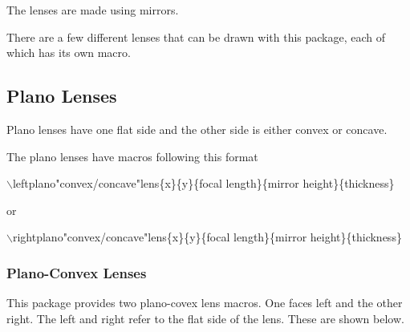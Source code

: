 \documentclass[12pt]{article}
\begin{document}
The lenses are made using mirrors.

There are a few different lenses that can be drawn with this package, each of which has its own macro.

\subsection{Plano Lenses}
Plano lenses have one flat side and the other side is either convex or concave.

The plano lenses have macros following this format

$\backslash$leftplano"convex/concave"lens\{x\}\{y\}\{focal length\}\{mirror height\}\{thickness\}

or

$\backslash$rightplano"convex/concave"lens\{x\}\{y\}\{focal length\}\{mirror height\}\{thickness\}

\subsubsection{Plano-Convex Lenses}

This package provides two plano-covex lens macros. One faces left and the other right. The left and right refer to the flat side of the lens. These are shown below.
\end{document}
